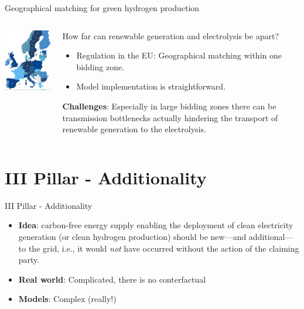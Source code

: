 \begin{frame}{Geographical matching for green hydrogen production}
\begin{columns}
	\begin{column}{0.4\textwidth}
		\includegraphics[width=5cm, clip, trim={0 0.1cm 0 0}]{images/biding_zones_eu.png}
	\end{column}
	\begin{column}{0.6\textwidth}
		How far can renewable generation and electrolysis be apart? 
		\begin{itemize}
			\item 	Regulation in the EU: Geographical matching within one \alert{bidding zone}.
			\item 	Model implementation is straightforward. 
		\end{itemize}

	\vspace{0.5 cm}
		\textbf{Challenges}: Especially in large bidding zones there can be \alert{transmission bottlenecks} actually hindering the transport of renewable generation to the electrolysis. 
	\end{column}
\end{columns}
\end{frame}

\section{III Pillar - Additionality}
\begin{frame}{III Pillar - Additionality}

  \begin{itemize}
  
  \item  \textbf{Idea}: carbon-free energy supply enabling the deployment of clean electricity generation (or clean hydrogen production) should be new---\alert{and additional}---to the grid, i.e., it would \textit{not} have occurred without the action of the claiming party.

  \item \textbf{Real world}: Complicated, there is no conterfactual

  \item \textbf{Models}: Complex (really!)
  
  \end{itemize}

\end{frame}


